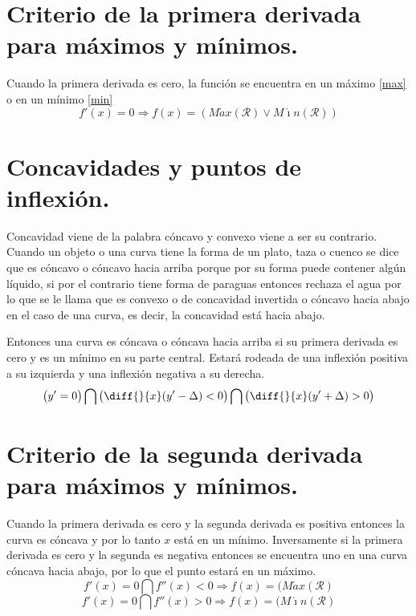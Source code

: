 \documentclass[oneside,spanish,letterpaper]{extbook}
\theoremstyle{mythmstyle}
\begin{document}
\section{Criterio de la primera derivada para máximos y mínimos.}
Cuando la primera derivada es cero, la función se encuentra en un máximo \ref{max} o en un mínimo \ref{min}
\begin{equation}
  f'(x)=0 \Rightarrow f(x)=(M\acute{a}x(\mathscr{R}) \vee M\acute{\imath}n(\mathscr{R}))
\end{equation}

\section{Concavidades y puntos de inflexión.}
Concavidad viene de la palabra cóncavo y convexo viene a ser su contrario. Cuando un objeto o una curva tiene la forma de
un plato, taza o cuenco se dice que es cóncavo o cóncavo hacia arriba porque por su forma puede contener algún líquido, si por el contrario tiene forma
de paraguas entonces rechaza el agua por lo que se le llama que es convexo o de concavidad invertida o cóncavo hacia abajo en el caso de una
curva, es decir, la concavidad está hacia abajo.

Entonces una curva es cóncava o cóncava hacia arriba si su primera derivada es cero y es un mínimo en su parte central.
Estará rodeada de una inflexión positiva a su izquierda y una inflexión negativa a su derecha.
\begin{equation}
 \left(y'=0\right)\bigcap\left( \diff{}{x}(y'-\Delta)<0\right)\bigcap\left(\diff{}{x}(y'+\Delta)>0\right)
\end{equation}

\section{Criterio de la segunda derivada para máximos y mínimos.}
Cuando la primera derivada es cero y la segunda derivada es positiva entonces la curva es cóncava y por lo tanto $x$ está en un mínimo. Inversamente si 
la primera derivada es cero y la segunda es negativa entonces se encuentra uno en una curva cóncava hacia abajo, por lo que el punto estará en un máximo.
\begin{equation}
 f'(x)=0 \bigcap f''(x)<0 \Rightarrow f(x)=(M\acute{a}x(\mathscr{R})
\end{equation}
\begin{equation}
 f'(x)=0 \bigcap f''(x)>0 \Rightarrow f(x)=(M\acute{\imath}n(\mathscr{R})
\end{equation}
\end{document}
